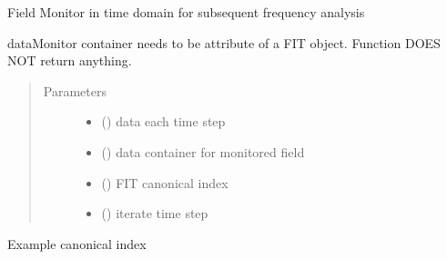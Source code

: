 \documentclass[letterpaper,10pt,english]{sphinxmanual}
\begin{document}
\begin{fulllineitems}
\begin{fulllineitems}
\begin{quote}
\begin{description}
\end{description}\end{quote}

\end{fulllineitems}


\begin{fulllineitems}
\label{\detokenize{FIT:FIT.FIT.fieldProbe}}
Field Monitor in time domain for subsequent frequency analysis

dataMonitor container needs to be attribute of a FIT object. Function DOES NOT return anything.
\begin{quote}\begin{description}
\item[{Parameters}] \leavevmode\begin{itemize}
\item {} 
 () \textendash{} data each time step

\item {} 
 () \textendash{} data container for monitored field

\item {} 
 () \textendash{} FIT canonical index

\item {} 
 () \textendash{} iterate time step

\end{itemize}

\end{description}\end{quote}
\begin{description}
\item[{Example canonical index}] \leavevmode
{}%
\begin{sphinxVerbatim}[commandchars=\\\{\}]
  \PYG{p}{[}    \PYG{p}{]}
\end{sphinxVerbatim}


\end{description}
\end{fulllineitems}
\end{fulllineitems}
\end{document}
